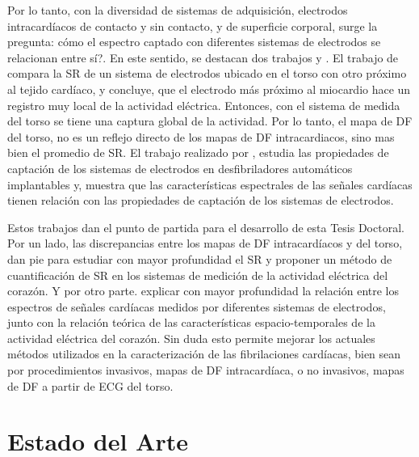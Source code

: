 Por lo tanto, con la diversidad de sistemas de adquisición, electrodos
intracardíacos de contacto y sin contacto, y de superficie corporal, surge la
pregunta: cómo el espectro captado con diferentes sistemas de electrodos se
relacionan entre sí?. En este sentido, se destacan dos trabajos  \cite{lemay08}
y \cite{Requena08}. El trabajo de \cite{lemay08} compara la \ac{SR} de un
sistema de electrodos ubicado en el torso con otro próximo al tejido cardíaco, y
concluye, que el electrodo  más próximo al miocardio hace un registro muy local
de la actividad eléctrica.  Entonces, con el sistema de medida del torso se
tiene una captura global de la actividad.  Por lo tanto, el mapa de \ac{DF} del
torso, no es un reflejo directo de los mapas de \ac{DF} intracardiacos, sino mas
bien el promedio de \ac{SR}. El trabajo realizado por \cite{Requena08}, estudia
las propiedades de captación de los sistemas de electrodos en desfibriladores
automáticos implantables y, muestra que las características espectrales de las
señales cardíacas tienen relación con las propiedades de captación de los
sistemas de electrodos.

Estos trabajos dan el punto de partida para el desarrollo de esta Tesis
Doctoral. Por un lado, las discrepancias entre los mapas de \ac{DF}
intracardíacos y del torso, dan pie para estudiar con mayor profundidad el
\ac{SR} y proponer un método de cuantificación de \ac{SR} en los sistemas de
medición de la actividad eléctrica del corazón. Y por otro parte. explicar con
mayor profundidad la relación entre los espectros de señales cardíacas medidos
por diferentes sistemas de electrodos, junto con la relación teórica de las
características espacio-temporales de la actividad eléctrica del corazón. Sin
duda esto permite mejorar los actuales métodos utilizados en la caracterización
de las fibrilaciones cardíacas, bien sean por procedimientos invasivos, mapas de
\ac{DF} intracardíaca, o no invasivos, mapas de \ac{DF} a partir de ECG del
torso.




\section{Estado del Arte}

